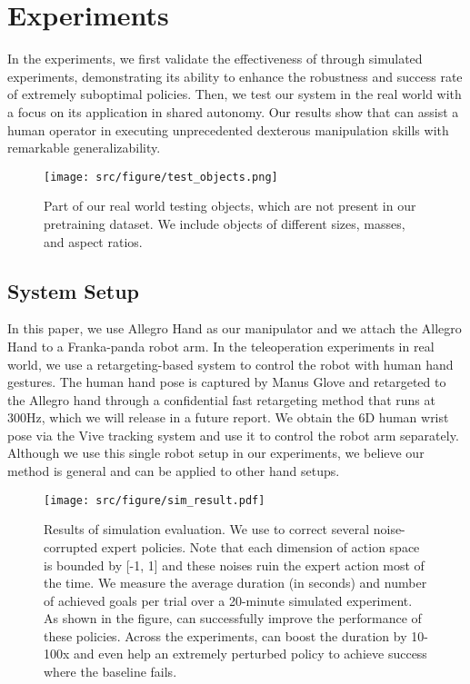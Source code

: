 \section{Experiments}
In the experiments, we first validate the effectiveness of \mname{} through simulated experiments, demonstrating its ability to enhance the robustness and success rate of extremely suboptimal policies. Then, we test our system in the real world with a focus on its application in shared autonomy.  Our results show that \mname{} can assist a human operator in executing unprecedented dexterous manipulation skills with remarkable generalizability.

\begin{figure}[t]
    \centering
    \texttt{[image: src/figure/test\_objects.png]}
    \caption{Part of our real world testing objects, which are not present in our pretraining dataset. We include objects of different sizes, masses, and aspect ratios.}
    \label{fig:enter-label}
\end{figure}
\subsection{System Setup}
In this paper, we use Allegro Hand as our manipulator and we attach the Allegro Hand to a Franka-panda robot arm. In the teleoperation experiments in real world, we use a retargeting-based system to control the robot with human hand gestures. The human hand pose is captured by Manus Glove and retargeted to the Allegro hand through a confidential fast retargeting method that runs at 300Hz, which we will release in a future report. We obtain the 6D human wrist pose via the Vive tracking system and use it to control the robot arm separately. Although we use this single robot setup in our experiments, we believe our method is general and can be applied to other hand setups. 
\begin{figure*}
    \centering
    \texttt{[image: src/figure/sim\_result.pdf]}
    \caption{Results of simulation evaluation. We use \mname{} to correct several noise-corrupted expert policies. Note that each dimension of action space is bounded by [-1, 1] and these noises ruin the expert action most of the time. We measure the average duration (in seconds) and number of achieved goals per trial over a 20-minute simulated experiment. As shown in the figure, \mname{} can successfully improve the performance of these policies. Across the experiments, \mname{} can boost the duration by 10-100x and even help an extremely perturbed policy to achieve success where the baseline fails. }
    \label{fig:simulation}
\end{figure*}

